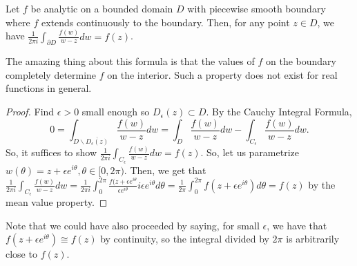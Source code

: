 \documentclass[11pt,leqno,oneside]{amsart}
\begin{document}
  \begin{thm}
    Let $f$ be analytic on a bounded domain $D$ with piecewise smooth
    boundary where $f$ extends continuously to the boundary. Then, for
    any point $z \in D$, we have $\frac{1}{2\pi i} \int_{\partial D}
    \frac{f(w)}{w-z}dw = f(z)$.
  \end{thm}
  The amazing thing about this formula is that the values of $f$ on
  the boundary completely determine $f$ on the interior. Such a
  property does not exist for real functions in general.
  \begin{proof}
    Find $\epsilon > 0$ small enough so $D_\epsilon(z) \subset D$. By
    the Cauchy Integral Formula,
    \[0 = \int_{D \smallsetminus \overline{D_\epsilon(z)}}
      \frac{f(w)}{w-z}dw = \int_D \frac{f(w)}{w-z}dw -
      \int_{C_\epsilon} \frac{f(w)}{w-z}dw.\]
    So, it suffices to show $\frac{1}{2 \pi i}\int_{C_\epsilon}
    \frac{f(w)}{w-z}dw = f(z)$. So, let us parametrize $w(\theta) =
    z+\epsilon e^{i\theta}, \theta \in [0,2 \pi)$. Then, we get that
    $\frac{1}{2 \pi i}\int_{C_\epsilon} \frac{f(w)}{w-z}dw =
    \frac{1}{2\pi i}\int_0^{2 \pi} \frac{f(z+\epsilon
      e^{i\theta}}{\epsilon e^{i\theta}} i \epsilon e^{i \theta}
    d\theta = \frac{1}{2\pi}\int_0^{2 \pi} f(z+\epsilon e^{i \theta})
    d \theta = f(z)$ by the mean value property.
  \end{proof}
  Note that we could have also proceeded by saying, for small
  $\epsilon$, we have that $f(z+\epsilon e^{i \theta}) \cong f(z)$ by
  continuity, so the integral divided by $2 \pi$ is arbitrarily close
  to $f(z)$.
\end{document}

